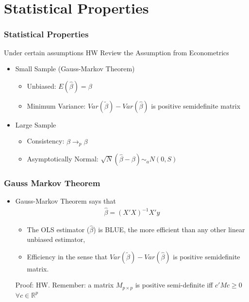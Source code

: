 \documentclass[
  shownotes,
  xcolor={svgnames},
  hyperref={colorlinks,citecolor=DarkBlue,linkcolor=DarkRed,urlcolor=DarkBlue}
  , aspectratio=169]{beamer}
\begin{document}
\section{Statistical Properties}
\begin{frame}
\frametitle{Statistical Properties}

Under certain assumptions {\tiny HW Review the Assumption from Econometrics}
\bigskip
\begin{itemize}
  \item Small Sample (Gauss-Markov Theorem)
  \medskip
  \begin{itemize}
    \item Unbiased: $E(\hat \beta) = \beta$
    \medskip
    \item Minimum Variance: $Var(\tilde \beta) - Var(\hat \beta)$ is positive semidefinite matrix
  \end{itemize}
\bigskip  
  \item Large Sample
  \medskip
  \begin{itemize}
    \item Consistency: $\hat \beta \rightarrow_p \beta$
    \medskip
    \item Asymptotically Normal: $\sqrt{N}(\hat \beta -\beta) \sim_a N(0,S)$
  \end{itemize}

\end{itemize}


\end{frame}
\begin{frame}
\frametitle{Gauss Markov Theorem}

\begin{itemize}

\item Gauss-Markov Theorem says that 
\medskip
\begin{align}
 \hat \beta = (X'X)^{-1} X'y
\end{align}

\bigskip

\begin{itemize}
  \item The OLS estimator ($\hat \beta$) is BLUE, the more efficient than any other linear unbiased estimator, 
  \medskip
  \item Efficiency in the sense that  $Var(\tilde \beta) - Var(\hat \beta)$ is positive semidefinite matrix.
\end{itemize}

\bigskip
\tiny Proof: HW. Remember: a matrix $M_{p\times p}$ is positive semi-definite iff $c'Mc\geq0$ $\forall c\in \mathbb{R}^p$
\end{itemize}
\end{frame}
\end{document}
